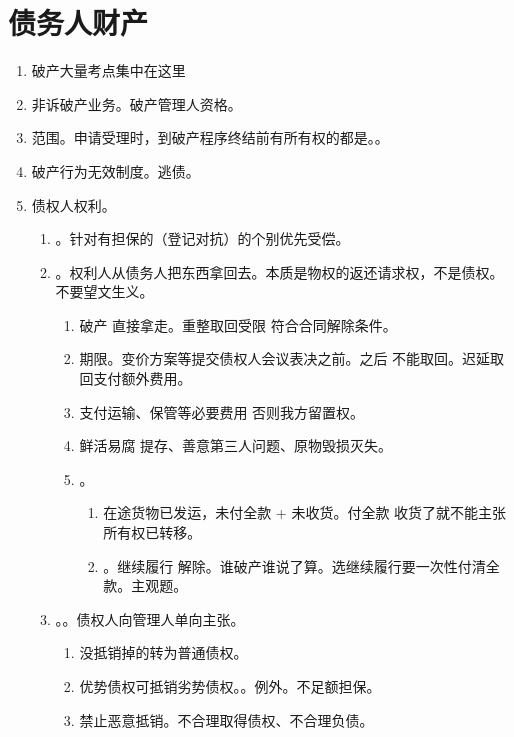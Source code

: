 \section{债务人财产}
\begin{enumerate}
  \item 破产大量考点集中在这里
  \item 非诉破产业务。破产管理人资格。
  \item 范围。申请受理时，到破产程序终结前有所有权的都是。。
  \item 破产行为无效制度。逃债。
  \item 债权人权利。
        \begin{enumerate}
          \item {}。针对有担保的（登记对抗）的个别优先受偿。
          \item {}。权利人从债务人把东西拿回去。本质是物权的返还请求权，不是债权。不要望文生义。
                \begin{enumerate}
                  \item 破产 \yjt 直接拿走。重整取回受限 \yjt 符合合同解除条件。
                  \item 期限。变价方案等提交债权人会议表决之前。之后 \bdy 不能取回。迟延取回支付额外费用。
                  \item 支付运输、保管等必要费用 \yjt 否则我方留置权。
                  \item 鲜活易腐 \yjt 提存、善意第三人问题、原物毁损灭失。
                  \item {}。
                        \begin{enumerate}
                          \item 在途货物已发运，未付全款 + 未收货。付全款 \hz 收货了就不能主张 \yjt 所有权已转移。
                          \item {}。继续履行 \hz 解除。谁破产谁说了算。选继续履行要一次性付清全款。主观题。
                        \end{enumerate}
                \end{enumerate}
          \item {}。。债权人向管理人单向主张。
                \begin{enumerate}
                  \item 没抵销掉的转为普通债权。
                  \item 优势债权可抵销劣势债权。。例外。不足额担保。
                  \item 禁止恶意抵销。不合理取得债权、不合理负债。

\end{enumerate}
\end{enumerate}
\end{enumerate}
